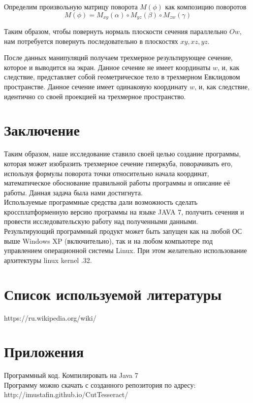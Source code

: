 \documentclass[12pt, a4paper, twoside]{report}
\begin{document}
																		Определим произвольную матрицу поворота $M(\phi)$ как композицию поворотов $$M(\phi)=M_{xy}(\alpha)\circ M_{yz}(\beta)\circ M_{zw}(\gamma)$$

Таким образом, чтобы повернуть нормаль плоскости сечения параллельно $Ow$, нам потребуется повернуть последовательно в плоскостях $xy, xz, yz$.

После данных манипуляций получаем трехмерное результирующее сечение, которое и выводится на экран. Данное сечение не имеет координаты $w$, и, как следствие, представляет собой геометрическое тело в трехмерном Евклидовом пространстве.
Данное сечение имеет одинаковую координату $w$, и, как следствие, идентично со своей проекцией на трехмерное пространство.

\section{Заключение}
Таким образом, наше исследование ставило своей целью создание программы, которая может изобразить трехмерное сечение гиперкуба, поворачивать его, используя формулы поворота точки относительно начала координат, математическое обоснование правильной работы программы и описание её работы. Данная задача была нами достигнута.
\\

Используемые программные средства дали возможность сделать кроссплатформенную версию программы на языке JAVA 7, получить сечения и провести исследовательскую работу над полученными данными. \\

Результирующий программный продукт может быть запущен как на любой ОС выше Windows XP (включительно), так и на любом компьютере под управлением операционной системы Linux. При этом желательно использование архитектуры linux kernel .32.
\section{Список используемой литературы}
https://ru.wikipedia.org/wiki/ \\
\section{Приложения}
Программный код. Компилировать на Java 7 \\
Программу можно скачать с созданного репозитория по адресу: \\
http://imustafin.github.io/CutTesseract/ \\
\end{document}
